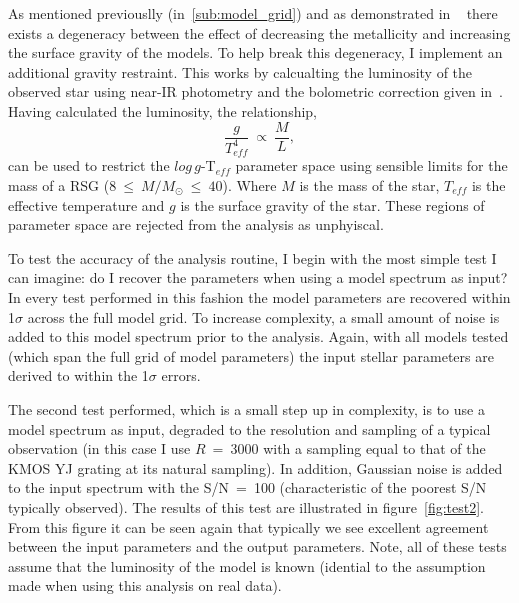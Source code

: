 As mentioned previouslly (in~\ref{sub:model_grid}) and as demonstrated in
~\cite{2015ApJ...806...21D} there exists a degeneracy between the effect of decreasing the metallicity and increasing the surface gravity of the models.
To help break this degeneracy, I implement an additional gravity restraint.
This works by calcualting the luminosity of the observed star using near-IR photometry and the bolometric correction given in~\cite{Davies13b}.
Having calculated the luminosity, the relationship,
\begin{equation}
    \frac{g}{T^{4}_{eff}}~\propto~\frac{M}{L},
\end{equation}
can be used to restrict the $log\,g$-T$_{eff}$
parameter space using sensible limits for the mass of a RSG
($8~\leq~M/M_{\odot}~\leq~40$).
Where $M$ is the mass of the star,
$T_{eff}$ is the effective temperature and $g$ is the surface gravity of the star.
These regions of parameter space are rejected from the analysis as unphyiscal.

To test the accuracy of the analysis routine, I begin with the most simple test I can imagine:
do I recover the parameters when using a model spectrum as input?
In every test performed in this fashion the model parameters are recovered within 1$\sigma$ across the full model grid.
To increase complexity, a small amount of noise is added to this model spectrum prior to the analysis.
Again, with all models tested (which span the full grid of model parameters) the input stellar parameters are derived to within the 1$\sigma$ errors.

The second test performed, which is a small step up in complexity, is to use a model spectrum as input, degraded to the resolution and sampling of a typical observation (in this case I use $R~=~3000$ with a sampling equal to that of the KMOS YJ grating at its natural sampling).
In addition, Gaussian noise is added to the input spectrum with the S/N~=~100
(characteristic of the poorest S/N typically observed).
The results of this test are illustrated in figure~\ref{fig:test2}.
From this figure it can be seen again that typically we see excellent agreement between the input parameters and the output parameters.
Note, all of these tests assume that the luminosity of the model is known
(idential to the assumption made when using this analysis on real data).

